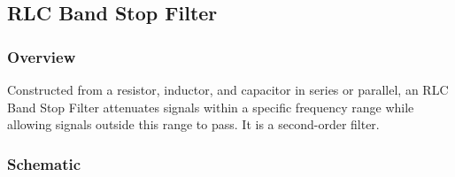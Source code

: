 \subsection{RLC Band Stop Filter}

\subsubsection{Overview}
Constructed from a resistor, inductor, and capacitor in series or
parallel, an RLC Band Stop Filter attenuates signals within a
specific frequency range while allowing signals outside this range
to pass. It is a second-order filter.

\subsubsection{Schematic}
